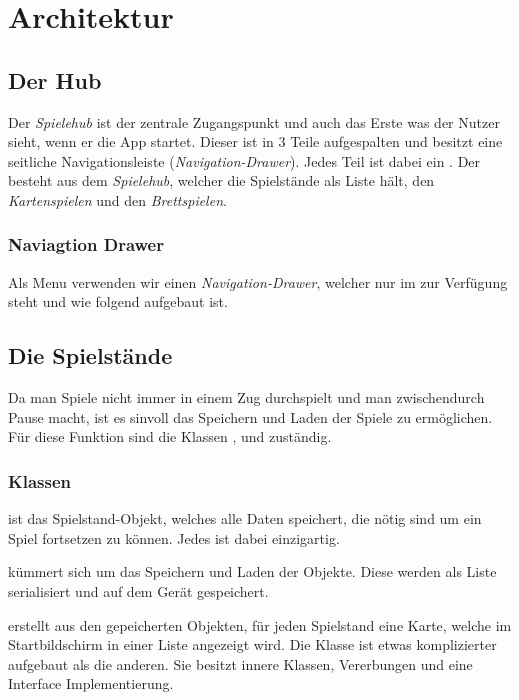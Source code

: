 \chapter{Architektur}

\section{Der Hub}
\sectionauthor{\leonard}

Der \emph{Spielehub} ist der zentrale Zugangspunkt und auch das Erste was der 
Nutzer sieht, wenn er die App startet. Dieser ist in 3 Teile aufgespalten und besitzt 
eine seitliche Navigationsleiste (\emph{Navigation-Drawer}). Jedes Teil ist dabei
ein . Der  besteht aus dem \emph{Spielehub}, welcher 
die Spielstände als Liste hält, den \emph{Kartenspielen} und den \emph{Brettspielen}.


\subsection{Naviagtion Drawer}

Als Menu verwenden wir einen \emph{Navigation-Drawer}, welcher nur im  
zur Verfügung steht und wie folgend aufgebaut ist. 

\section{Die Spielstände}
\sectionauthor{\leonard}

Da man Spiele nicht immer in einem Zug durchspielt und man zwischendurch Pause
macht, ist es sinvoll das Speichern und Laden der Spiele zu ermöglichen. Für
diese Funktion sind die Klassen ,  und
 zuständig.

\subsection{Klassen}

 ist das Spielstand-Objekt, welches alle Daten speichert, die
nötig sind um ein Spiel fortsetzen zu können. Jedes  ist dabei
einzigartig.

 kümmert sich um das Speichern und Laden der
 Objekte. Diese werden als Liste serialisiert und auf dem Gerät
gespeichert.

 erstellt aus den gepeicherten  Objekten,
für jeden Spielstand eine Karte, welche im Startbildschirm in einer Liste
angezeigt wird. Die Klasse ist etwas komplizierter aufgebaut als die anderen.
Sie besitzt innere Klassen, Vererbungen und eine Interface Implementierung.

